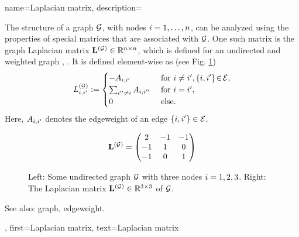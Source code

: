 {name={Laplacian matrix},
	description={The structure of a \gls{graph} $\mathcal{G}$, with 
		nodes $i=1,\ldots,n$, can be analyzed using the properties of 
		special matrices that are associated with $\mathcal{G}$. One such matrix is the 
		\gls{graph} Laplacian matrix ${\bf L}^{(\mathcal{G})} \in \mathbb{R}^{n \times n}$, 
		which is defined for an undirected and weighted \gls{graph} \cite{Luxburg2007}, \cite{Ng2001}. 
		It is defined element-wise as (see Fig. \ref{fig_lap_mtx_dict})
	\begin{equation}
		L^{(\mathcal{G})}_{i,i'} := \begin{cases} - A_{i,i'} & \mbox{ for } i\neq i', \{i,i'\}\!\in\!\mathcal{E}, \\ 
			\sum_{i'' \neq i} A_{i,i''} & \mbox{ for } i = i', \\ 
							0 & \mbox{ else.} \end{cases}
	 \end{equation}
  		Here, $A_{i,i'}$ denotes the \gls{edgeweight} of an edge $\{i,i'\} \in \mathcal{E}$. 
  	\begin{figure}[H]
  	\begin{center}
   	\begin{minipage}{0.45\textwidth}
	 			 	\end{minipage} 
	 			 	\hspace*{-15mm}
 		 		\begin{minipage}{0.45\textwidth}
	 			 	 \begin{equation} 
	 				 		 {\bf L}^{(\mathcal{G})} = \begin{pmatrix} 2 & -1& -1 \\ -1& 1 & 0 \\  -1 & 0 & 1 \end{pmatrix}  
	 				 		 \nonumber
	 				 		 \end{equation} 
	 			 \end{minipage}
	 	 \caption{\label{fig_lap_mtx_dict} Left: Some undirected \gls{graph} $\mathcal{G}$ with three nodes $i=1,2,3$. 
	 		 	Right: The Laplacian matrix ${\bf L}^{(\mathcal{G})}  \in \mathbb{R}^{3 \times 3}$ of $\mathcal{G}$.} 
	 		 	\end{center}
	 \end{figure}
		See also: \gls{graph}, \gls{edgeweight}.},
	first={Laplacian matrix},
	text={Laplacian matrix}
}

